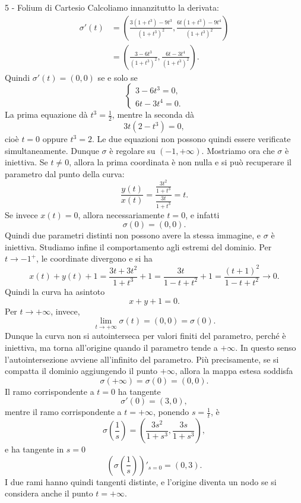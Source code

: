 \documentclass[a4paper]{article}
\begin{document}
\begin{snippetsolution}{5 - Folium di Cartesio}
    Calcoliamo innanzitutto la derivata:
    \begin{align*}
        \sigma'(t)
        &=
        \left(
            \frac{3(1+t^3)-9t^3}{(1+t^3)^2},
            \frac{6t(1+t^3)-9t^4}{(1+t^3)^2}
        \right)\\
        &=
        \left(
            \frac{3-6t^3}{(1+t^3)^2},
            \frac{6t-3t^4}{(1+t^3)^2}
        \right).
    \end{align*}
    Quindi \(\sigma'(t)=(0,0)\) se e solo se
    \[
        \begin{cases}
            3-6t^3=0,\\
            6t-3t^4=0.
        \end{cases}
    \]
    La prima equazione dà \(t^3=\frac12\), mentre la seconda dà
    \[
        3t(2-t^3)=0,
    \]
    cioè \(t=0\) oppure \(t^3=2\). Le due equazioni non possono quindi essere verificate simultaneamente. Dunque \(\sigma\) è regolare su \((-1,+\infty)\).
    Mostriamo ora che \(\sigma\) è iniettiva. Se \(t\neq 0\), allora la prima coordinata è non nulla e si può recuperare il parametro dal punto della curva:
    \[
        \frac{y(t)}{x(t)}
        =
        \frac{\frac{3t^2}{1+t^3}}{\frac{3t}{1+t^3}}
        =
        t.
    \]
    Se invece \(x(t)=0\), allora necessariamente \(t=0\), e infatti
    \[
        \sigma(0)=(0,0).
    \]
    Quindi due parametri distinti non possono avere la stessa immagine, e \(\sigma\) è iniettiva.
    Studiamo infine il comportamento agli estremi del dominio. Per \(t\to -1^+\), le coordinate divergono e si ha
    \[
        x(t)+y(t)+1
        =
        \frac{3t+3t^2}{1+t^3}+1
        =
        \frac{3t}{1-t+t^2}+1
        =
        \frac{(t+1)^2}{1-t+t^2}
        \longrightarrow 0.
    \]
    Quindi la curva ha asintoto
    \[
        x+y+1=0.
    \]
    Per \(t\to+\infty\), invece,
    \[
        \lim_{t\to+\infty}\sigma(t)=(0,0)=\sigma(0).
    \]
    Dunque la curva non si autointerseca per valori finiti del parametro, perché è iniettiva, ma torna all'origine quando il parametro tende a \(+\infty\). In questo senso l'autointersezione avviene all'infinito del parametro.
    Più precisamente, se si compatta il dominio aggiungendo il punto \(+\infty\), allora la mappa estesa soddisfa
    \[
        \sigma(+\infty)=\sigma(0)=(0,0).
    \]
    Il ramo corrispondente a \(t=0\) ha tangente
    \[
        \sigma'(0)=(3,0),
    \]
    mentre il ramo corrispondente a \(t=+\infty\), ponendo \(s=\frac1t\), è
    \[
        \sigma\left(\frac1s\right)
        =
        \left(
            \frac{3s^2}{1+s^3},
            \frac{3s}{1+s^3}
        \right),
    \]
    e ha tangente in \(s=0\)
    \[
        \left(\sigma\left(\frac1s\right)\right)'_{s=0}=(0,3).
    \]
    I due rami hanno quindi tangenti distinte, e l'origine diventa un nodo se si considera anche il punto \(t=+\infty\).
\end{snippetsolution}
\end{document}
